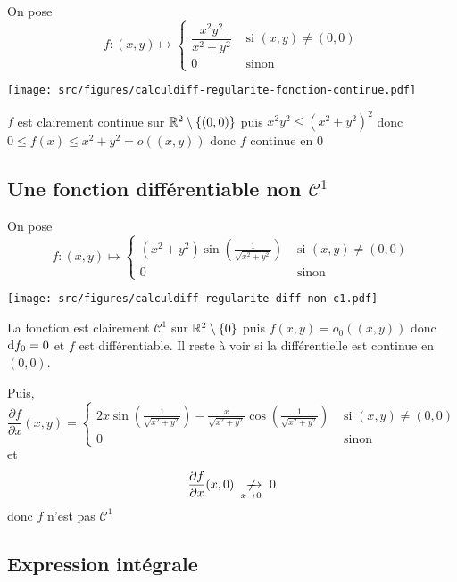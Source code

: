 On pose \[
    f:(x, y)\longmapsto \begin{cases}
        \dfrac{x^2y^2}{x^2+y^2} &\text{ si } (x, y)\neq (0, 0) \\
        0 &\text{ sinon }
    \end{cases}
\]

\begin{center}
    \texttt{[image: src/figures/calculdiff-regularite-fonction-continue.pdf]}
\end{center}

$f$ est clairement continue sur $\mathbb R^2\setminus\{(0, 0)\}$ puis $x^2y^2\leq (x^2+y^2)^2$ donc $0\leq f(x)\leq x^2+y^2=o((x, y))$ donc $f$ continue en $0$

\subsection{Une fonction différentiable non \texorpdfstring{$\mathcal C^1$}{C1}}

On pose \[
    f:(x, y)\longmapsto \begin{cases}
        \displaystyle (x^2+y^2)\sin \left( \frac{1}{\sqrt{x^2+y^2}}  \right) &\text{ si } (x, y)\neq (0, 0) \\
        0 &\text{ sinon }
    \end{cases}
\]

\begin{center}
    \texttt{[image: src/figures/calculdiff-regularite-diff-non-c1.pdf]}
\end{center}

La fonction est clairement $\mathcal C^1$ sur $\mathbb R^2\setminus\{0\}$ puis $f(x, y)=o_0((x, y))$ donc $\mathrm{d} f_0=0$ et $f$ est différentiable. Il reste à voir si la différentielle est continue en $(0, 0)$.

Puis, \[
    \frac{\partial f}{\partial x} (x, y)= \begin{cases}
        \displaystyle 2x\sin \left( \frac{1}{\sqrt{x^2+y^2}} \right)-\frac x{\sqrt{x^2+y^2}}\cos \left( \frac{1}{\sqrt{x^2+y^2}}  \right) &\text{ si } (x, y)\neq (0, 0) \\ 0 &\text{ sinon }
    \end{cases}
\]
et \[
    \frac{\partial f}{\partial x} (x, 0)\xnrightarrow[x\to 0]{} 0
\]
donc $f$ n'est pas $\mathcal C^1$

\subsection{Expression intégrale}

